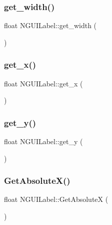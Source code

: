 \hypertarget{class_n_g_u_i_label_a26461134749f91eebc3fedccce08b69c}{}\label{class_n_g_u_i_label_a26461134749f91eebc3fedccce08b69c} 
\subsubsection{\texorpdfstring{get\+\_\+width()}{get\_width()}}
{\footnotesize\ttfamily float N\+G\+U\+I\+Label\+::get\+\_\+width (\begin{DoxyParamCaption}{ }\end{DoxyParamCaption})}

\hypertarget{class_n_g_u_i_label_a9aeedb64a9094289398a50b100d508d4}{}\label{class_n_g_u_i_label_a9aeedb64a9094289398a50b100d508d4} 
\subsubsection{\texorpdfstring{get\+\_\+x()}{get\_x()}}
{\footnotesize\ttfamily float N\+G\+U\+I\+Label\+::get\+\_\+x (\begin{DoxyParamCaption}{ }\end{DoxyParamCaption})}

\hypertarget{class_n_g_u_i_label_a962b729834fd29c5f0c51775b9547851}{}\label{class_n_g_u_i_label_a962b729834fd29c5f0c51775b9547851} 
\subsubsection{\texorpdfstring{get\+\_\+y()}{get\_y()}}
{\footnotesize\ttfamily float N\+G\+U\+I\+Label\+::get\+\_\+y (\begin{DoxyParamCaption}{ }\end{DoxyParamCaption})}

\hypertarget{class_n_g_u_i_label_aacbba8632c21f990165e4d64f8e48dda}{}\label{class_n_g_u_i_label_aacbba8632c21f990165e4d64f8e48dda} 
\subsubsection{\texorpdfstring{Get\+Absolute\+X()}{GetAbsoluteX()}}
{\footnotesize\ttfamily float N\+G\+U\+I\+Label\+::\+Get\+AbsoluteX (\begin{DoxyParamCaption}{ }\end{DoxyParamCaption})}

